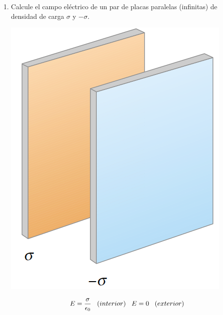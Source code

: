 \documentclass[11pt,twocolumn]{article}
\begin{document}
\begin{enumerate}
\item Calcule el campo eléctrico de un par de placas paralelas (infinitas) de densidad de carga $\sigma$ y $-\sigma$.
{
\begin{center}
\includegraphics[scale=0.2]{placas-paralelas}
\end{center}
}
\begin{displaymath}
E=\dfrac{\sigma}{\epsilon_{0}} \hspace{0.3 cm} (interior) \hspace{0.3 cm} E=0 \hspace{0.3 cm} (exterior)
\end{displaymath}

\end{enumerate}
\end{document}
